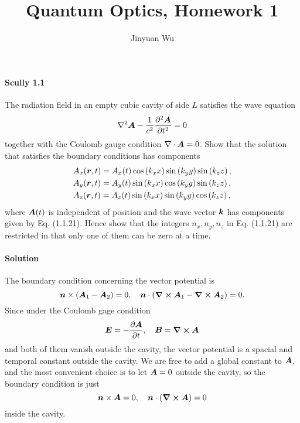 \documentclass[hyperref, a4paper]{article}
\title{Quantum Optics, Homework 1}
\author{Jinyuan Wu}
\begin{document}
\maketitle

\paragraph{Scully 1.1} The radiation field in an empty cubic cavity of side $L$ satisfies the wave equation
\begin{equation}
    \nabla^{2} \vb*{A}-\frac{1}{c^{2}} \frac{\partial^{2} \vb*{A}}{\partial t^{2}}=0
    \label{eq:scully-1-1-1}
\end{equation}
together with the Coulomb gauge condition $\nabla \cdot \vb*{A}=0$. Show that the solution that satisfies the boundary conditions has components
\begin{equation}
    \begin{aligned}
        &A_{x}(\vb*{r}, t)=A_{x}(t) \cos \left(k_{x} x\right) \sin \left(k_{y} y\right) \sin \left(k_{z} z\right), \\
        &A_{y}(\vb*{r}, t)=A_{y}(t) \sin \left(k_{x} x\right) \cos \left(k_{y} y\right) \sin \left(k_{z} z\right), \\
        &A_{z}(\vb*{r}, t)=A_{z}(t) \sin \left(k_{x} x\right) \sin \left(k_{y} y\right) \cos \left(k_{z} z\right),
        \end{aligned}
    \label{eq:scully-1-1-2}
\end{equation}
where $\vb*{A}(t)$ is independent of position and the wave vector $\vb*{k}$ has components given by Eq. (1.1.21). Hence show that the integers $n_{x}, n_{y}, n_{z}$ in Eq. (1.1.21) are restricted in that only one of them can be zero at a time.

\paragraph{Solution} The boundary condition concerning the vector potential is
\[
    \vb*{n} \times (\vb*{A}_1 - \vb*{A}_2) = 0, \quad \vb*{n} \cdot (\curl{\vb*{A}_1} - \curl{\vb*{A}_2}) = 0.
\]
Since under the Coulomb gage condition
\[
    \vb*{E} = - \pdv{\vb*{A}}{t}, \quad \vb*{B} = \curl{\vb*{A}}
\]
and both of them vanish outside the cavity, the vector potential is a spacial and temporal constant outside the cavity.
We are free to add a global constant to $\vb*{A}$, and the most convenient choice is to let $\vb*{A} = 0$ outside the cavity, so the boundary condition is just
\[
    \vb*{n} \times \vb*{A} = 0, \quad \vb*{n} \cdot (\curl{\vb*{A}}) = 0
\]
inside the cavity.
\end{document}
